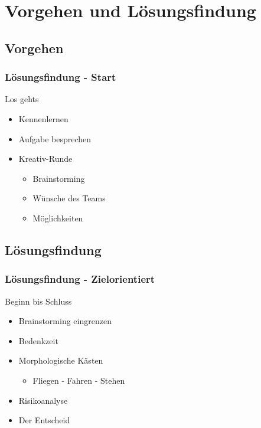 \section{Vorgehen und Lösungsfindung} %
\subsection{Vorgehen}
\begin{frame}
    \frametitle{Lösungsfindung - Start}
    \begin{block}{Los gehts}
    	\begin{itemize}
    		\item Kennenlernen
    		\item Aufgabe besprechen
    		\item Kreativ-Runde
    		\begin{itemize}
    			\item Brainstorming
    			\item Wünsche des Teams
    			\item Möglichkeiten
    		\end{itemize}
    	\end{itemize}
    \end{block}
\end{frame}
\subsection{Lösungsfindung}
\begin{frame}
    \frametitle{Lösungsfindung - Zielorientiert}
    \begin{block}{Beginn bis Schluss}
    	\begin{itemize}
    		\item Brainstorming eingrenzen 
    		\item Bedenkzeit
    		\item Morphologische Kästen
    		\begin{itemize}
    			\item Fliegen - Fahren - Stehen
    		\end{itemize}
	    	\item Risikoanalyse
	    	\item Der Entscheid
    	\end{itemize}
    \end{block}
\end{frame}
